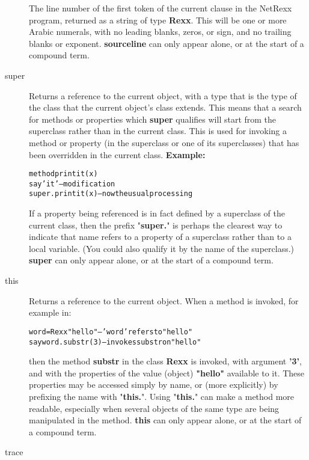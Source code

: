 \begin{description}
The line number of the first token of the current clause in the
NetRexx program, returned as a string of type \textbf{Rexx}.
This will be one or more Arabic numerals, with no leading blanks, zeros,
or sign, and no trailing blanks or exponent.
 \textbf{sourceline} can only appear alone, or at the start of a
compound term.
\item[super]\label{refswsuper}
 
Returns a reference to the current object, with a type that is the
type of the class that the current object's class extends.
This means that a search for methods or properties
which \textbf{super} qualifies will start from the superclass rather
than in the current class.
This is used for invoking a method or property (in the superclass or one
of its superclasses) that has been overridden in the current class.
 \textbf{Example:}
\begin{alltt}
method printit(x)
  say 'it'          -- modification
  super.printit(x)  -- now the usual processing
\end{alltt}
 
If a property being referenced is in fact defined by a superclass of
the current class, then the prefix "\textbf{super.}" is perhaps
the clearest way to indicate that name refers to a property of a
superclass rather than to a local variable.
(You could also qualify it by the name of the superclass.)
 \textbf{super} can only appear alone, or at the start of a
compound term.
\item[this]\label{refswthis}
 
Returns a reference to the current object.
When a method is invoked, for example in:
\begin{alltt}
word=Rexx "hello"  -- 'word' refers to "hello"
say word.substr(3) -- invokes substr on "hello"
\end{alltt}
then the method \textbf{substr} in the class \textbf{Rexx} is
invoked, with argument \textbf{'3'}, and with the properties of the
value (object) \textbf{"hello"} available to it.
These properties may be accessed simply by name, or (more explicitly) by
prefixing the name with "\textbf{this.}".
Using "\textbf{this.}" can make a method more readable,
especially when several objects of the same type are being manipulated
in the method.
 \textbf{this} can only appear alone, or at the start of a
compound term.
\item[trace]\label{refswtrace}


\end{description}
